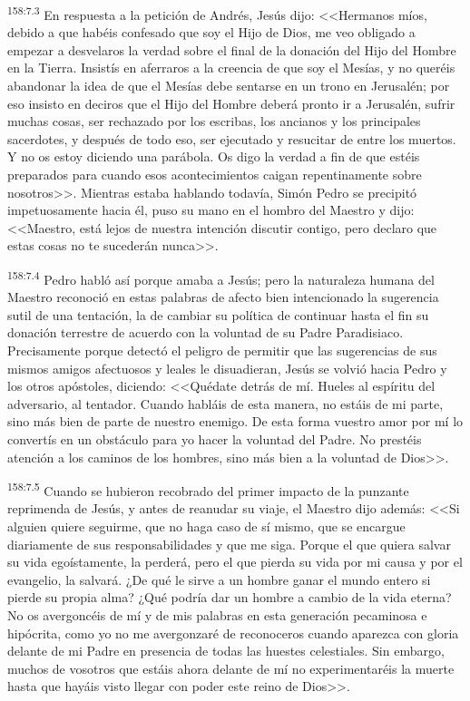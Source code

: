 \par 
\textsuperscript{158:7.3} En respuesta a la petición de Andrés, Jesús dijo: <<Hermanos míos, debido a que habéis confesado que soy el Hijo de Dios, me veo obligado a empezar a desvelaros la verdad sobre el final de la donación del Hijo del Hombre en la Tierra. Insistís en aferraros a la creencia de que soy el Mesías, y no queréis abandonar la idea de que el Mesías debe sentarse en un trono en Jerusalén; por eso insisto en deciros que el Hijo del Hombre deberá pronto ir a Jerusalén, sufrir muchas cosas, ser rechazado por los escribas, los ancianos y los principales sacerdotes, y después de todo eso, ser ejecutado y resucitar de entre los muertos. Y no os estoy diciendo una parábola. Os digo la verdad a fin de que estéis preparados para cuando esos acontecimientos caigan repentinamente sobre nosotros>>. Mientras estaba hablando todavía, Simón Pedro se precipitó impetuosamente hacia él, puso su mano en el hombro del Maestro y dijo: <<Maestro, está lejos de nuestra intención discutir contigo, pero declaro que estas cosas no te sucederán nunca>>.

\par 
\textsuperscript{158:7.4} Pedro habló así porque amaba a Jesús; pero la naturaleza humana del Maestro reconoció en estas palabras de afecto bien intencionado la sugerencia sutil de una tentación, la de cambiar su política de continuar hasta el fin su donación terrestre de acuerdo con la voluntad de su Padre Paradisiaco. Precisamente porque detectó el peligro de permitir que las sugerencias de sus mismos amigos afectuosos y leales le disuadieran, Jesús se volvió hacia Pedro y los otros apóstoles, diciendo: <<Quédate detrás de mí. Hueles al espíritu del adversario, al tentador. Cuando habláis de esta manera, no estáis de mi parte, sino más bien de parte de nuestro enemigo. De esta forma vuestro amor por mí lo convertís en un obstáculo para yo hacer la voluntad del Padre. No prestéis atención a los caminos de los hombres, sino más bien a la voluntad de Dios>>.

\par 
\textsuperscript{158:7.5} Cuando se hubieron recobrado del primer impacto de la punzante reprimenda de Jesús, y antes de reanudar su viaje, el Maestro dijo además: <<Si alguien quiere seguirme, que no haga caso de sí mismo, que se encargue diariamente de sus responsabilidades y que me siga. Porque el que quiera salvar su vida egoístamente, la perderá, pero el que pierda su vida por mi causa y por el evangelio, la salvará. ¿De qué le sirve a un hombre ganar el mundo entero si pierde su propia alma? ¿Qué podría dar un hombre a cambio de la vida eterna? No os avergoncéis de mí y de mis palabras en esta generación pecaminosa e hipócrita, como yo no me avergonzaré de reconoceros cuando aparezca con gloria delante de mi Padre en presencia de todas las huestes celestiales. Sin embargo, muchos de vosotros que estáis ahora delante de mí no experimentaréis la muerte hasta que hayáis visto llegar con poder este reino de Dios>>.

